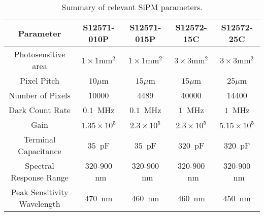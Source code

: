\begin{table}[!ht]
\begin{center}
\caption{Summary of relevant SiPM parameters.}
\label{tab:SiPMParameters}
\begin{tabular}{|c|c|c|c|c|}
\hline
Parameter & S12571-010P & S12571-015P & S12572-15C & S12572-25C\\
\hline
Photosensitive area              & $1\times1\mathrm{mm}^{2}$ & $1\times1\mathrm{mm}^{2}$ & $3\times3\mathrm{mm}^{2}$ & $3\times3\mathrm{mm}^{2}$\\
Pixel Pitch                            & $10\mu$m                             & $15\mu$m                             & $15\mu$m                              & $25\mu$m\\
Number of Pixels                 &  10000                                    &  4489                                      & 40000                                     & 14400                       \\
Dark Count Rate                  &  $0.1$~MHz                            &  $0.1$~MHz                            & $1$~MHz                                 & $1$~MHz                  \\
Gain                                    & $1.35\times10^{5}$                  & $2.3\times10^{5}$                & $2.3\times10^{5}$                 & $5.15\times10^{5}$  \\
Terminal Capacitance          & $35$~pF                                 & $35$~pF                                  & $320$~pF                                & $320$~pF                  \\
Spectral Response Range     & $320$-$900$~nm                  & $320$-$900$~nm                  & $320$-$900$~nm                   & $320$-$900$~nm     \\
Peak Sensitivity Wavelength & $470$~nm                              & $460$~nm                              & $460$~nm                               & $450$~nm               \\         
\hline
\end{tabular}
\end{center}
\end{table}